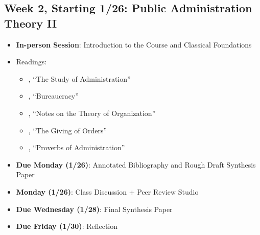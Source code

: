 \documentclass[11pt]{article}     %
\begin{document}
\subsection*{Week 2, Starting 1/26: Public Administration Theory II}
\begin{itemize}
    \item \textbf{In-person Session}: Introduction to the Course and Classical Foundations
    \item Readings:
        \begin{itemize}
            \item \citet{WILSON1887a}, ``The Study of Administration''
            \item \citet{Weber1946}, ``Bureaucracy''
            \item \citet{gulick1937}, ``Notes on the Theory of Organization''
            \item \citet{Follett1926}, ``The Giving of Orders''
            \item \citet{simon1946}, ``Proverbs of Administration''
        \end{itemize}
    \item \textbf{Due Monday (1/26)}: Annotated Bibliography and Rough Draft Synthesis Paper
    \item \textbf{Monday (1/26)}: Class Discussion + Peer Review Studio
    \item \textbf{Due Wednesday (1/28)}: Final Synthesis Paper
    \item \textbf{Due Friday (1/30)}: Reflection
\end{itemize}
\end{document}
